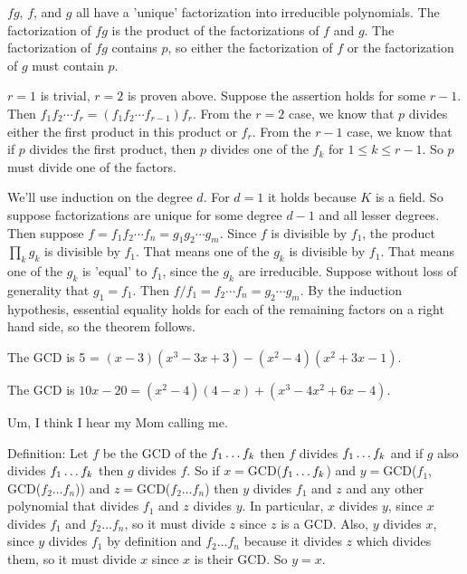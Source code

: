 \documentclass[11pt, oneside]{article}   	%
\begin{document}
\item \be
\item $fg$, $f$, and $g$ all have a 'unique' factorization into irreducible polynomials. The factorization of $fg$ is the product of the factorizations of $f$ and $g$. The factorization of $fg$ contains $p$, so either the factorization of $f$ or the factorization of $g$ must contain $p$.
\item $r=1$ is trivial, $r=2$ is proven above. Suppose the assertion holds for some $r-1$. Then $f_1f_2\cdots f_r = (f_1f_2\cdots f_{r-1})f_r$. From the $r=2$ case, we know that $p$ divides either the first product in this product or $f_r$. From the $r-1$ case, we know that if $p$ divides the first product, then $p$ divides one of the $f_k$ for $1 \le k \le r-1$. So $p$ must divide one of the factors.
\ee
\item We'll use induction on the degree $d$. For $d=1$ it holds because $K$ is a field. So suppose factorizations are unique for some degree $d-1$ and all lesser degrees. Then suppose $f=f_1f_2\cdots f_n = g_1g_2\cdots g_m$. Since $f$ is divisible by $f_1$, the product $\prod_k g_k$ is divisible by $f_1$. That means one of the $g_k$ is divisible by $f_1$. That means one of the $g_k$ is 'equal' to $f_1$, since the $g_k$ are irreducible. Suppose without loss of generality that $g_1 = f_1$. Then $f/f_1 = f_2\cdots f_n = g_2 \cdots g_m$. By the induction hypothesis, essential equality holds for each of the remaining factors on a right hand side, so the theorem follows.
\item \be \item The GCD is 5 = $(x-3)(x^3 - 3x + 3) - (x^2 - 4)(x^2 + 3x - 1).$
\item The GCD is $10x - 20 = (x^2 - 4)(4-x) + (x^3 - 4x^2 + 6x - 4)$.
\ee
\item Um, I think I hear my Mom calling me.
\item Definition: Let $f$ be the GCD of the $f_1 \ldots f_k$ then $f$ divides $f_1 \ldots f_k$ and if $g$ also divides $f_1 \ldots f_k$ then $g$ divides $f$. 
So if $x=$GCD($f_1 \ldots f_k$) and $y=$GCD($f_1, $GCD($f_2\ldots f_n$)) and $z=$GCD($f_2\ldots f_n$) then $y$ divides $f_1$ and $z$ and any other polynomial that divides $f_1$ and $z$ divides $y$. In particular, $x$ divides $y$, since $x$ divides $f_1$ and $f_2\ldots f_n$, so it must divide $z$ since $z$ is a GCD. Also, $y$ divides $x$, since $y$ divides $f_1$ by definition and $f_2 \ldots f_n$ because it divides $z$ which divides them, so it must divide $x$ since $x$ is their GCD. So $y = x$.
\item \be
\end{document}

